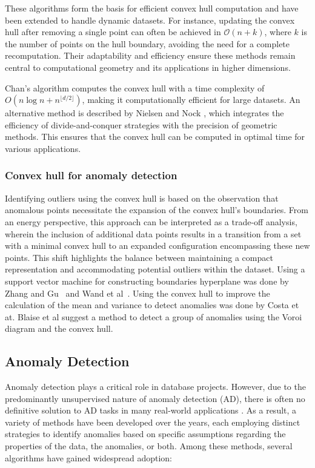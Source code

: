 These algorithms form the basis for efficient convex hull computation and have been extended to handle dynamic datasets. For instance, updating the convex hull after removing a single point can often be achieved in \(\mathcal{O}(n + k)\), where \(k\) is the number of points on the hull boundary, avoiding the need for a complete recomputation. Their adaptability and efficiency ensure these methods remain central to computational geometry and its applications in higher dimensions.

Chan's algorithm \cite{chan1996optimal} computes the convex hull with a time complexity of \( O(n \log n + n^{\lfloor d/2 \rfloor}) \), making it computationally efficient for large datasets. An alternative method is described by Nielsen and Nock \cite{nielsen2009sided}, which integrates the efficiency of divide-and-conquer strategies with the precision of geometric methods. This ensures that the convex hull can be computed in optimal time for various applications.

\subsubsection{Convex hull for anomaly detection}
Identifying outliers using the convex hull is based on the observation that anomalous points necessitate the expansion of the convex hull's boundaries. From an energy perspective, this approach can be interpreted as a trade-off analysis, wherein the inclusion of additional data points results in a transition from a set with a minimal convex hull to an expanded configuration encompassing these new points. This shift highlights the balance between maintaining a compact representation and accommodating potential outliers within the dataset.
Using a support vector machine for constructing boundaries hyperplane was done by Zhang and Gu~\cite{zhang2007ch} and Wand et al~\cite{wang2022anomaly}. Using the convex hull to improve the calculation of the mean and variance to detect anomalies was done by Costa et at\cite{costa2013partially}. Blaise et al \cite{blaise2022group} suggest a method to detect a group of anomalies using the Voroi diagram and the convex hull. 

\subsection{Anomaly Detection}
\label{sec:rw_anomaly_detection}
Anomaly detection plays a critical role in database projects. However, due to the predominantly unsupervised nature of anomaly detection (AD), there is often no definitive solution to AD tasks in many real-world applications \cite{ghahramani2003unsupervised}. As a result, a variety of methods have been developed over the years, each employing distinct strategies to identify anomalies based on specific assumptions regarding the properties of the data, the anomalies, or both. Among these methods, several algorithms have gained widespread adoption:

